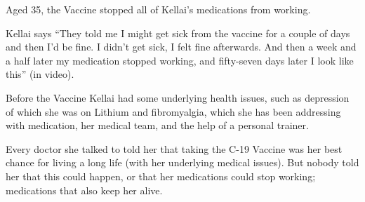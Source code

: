 Aged 35, the Vaccine stopped all of Kellai’s medications from working.

Kellai says “They told me I might get sick from the vaccine for a couple of days
and then I’d be fine. I didn’t get sick, I felt fine afterwards. And then a week
and a half later my medication stopped working, and fifty-seven days later I
look like this” (in video).

Before the Vaccine Kellai had some underlying health issues, such as depression
of which she was on Lithium and fibromyalgia, which she has been addressing with
medication, her medical team, and the help of a personal trainer.

Every doctor she talked to told her that taking the C-19 Vaccine was her best
chance for living a long life (with her underlying medical issues). But nobody
told her that this could happen, or that her medications could stop working;
medications that also keep her alive.


